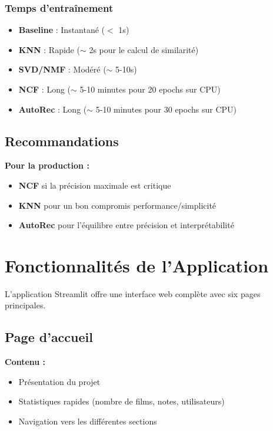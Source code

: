 \documentclass[12pt,a4paper]{article}
\begin{document}
\subsubsection{Temps d'entraînement}

\begin{itemize}
    \item \textbf{Baseline} : Instantané ($<$ 1s)
    \item \textbf{KNN} : Rapide ($\sim$ 2s pour le calcul de similarité)
    \item \textbf{SVD/NMF} : Modéré ($\sim$ 5-10s)
    \item \textbf{NCF} : Long ($\sim$ 5-10 minutes pour 20 epochs sur CPU)
    \item \textbf{AutoRec} : Long ($\sim$ 5-10 minutes pour 30 epochs sur CPU)
\end{itemize}

\subsection{Recommandations}

\textbf{Pour la production :}
\begin{itemize}
    \item \textbf{NCF} si la précision maximale est critique
    \item \textbf{KNN} pour un bon compromis performance/simplicité
    \item \textbf{AutoRec} pour l'équilibre entre précision et interprétabilité
\end{itemize}

\section{Fonctionnalités de l'Application}

L'application Streamlit offre une interface web complète avec six pages principales.

\subsection{Page d'accueil}

\textbf{Contenu :}
\begin{itemize}
    \item Présentation du projet
    \item Statistiques rapides (nombre de films, notes, utilisateurs)
    \item Navigation vers les différentes sections
\end{itemize}
\end{document}
